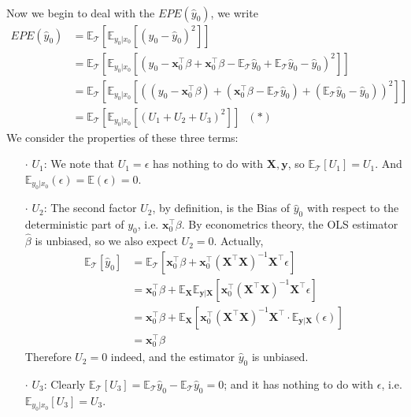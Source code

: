 \documentclass[a4paper, 11pt]{article}
\begin{document}
~\\
Now we begin to deal with the $EPE(\hat{y}_0)$, we write
\begin{equation}
	\begin{split}
		EPE(\hat{y}_0) & = \mathbb{E}_{\mathcal{T}}\left[\mathbb{E}_{y_0|x_0}\left[(y_0-\hat{y}_0)^2\right]\right] \\
		& = \mathbb{E}_{\mathcal{T}}\left[\mathbb{E}_{y_0|x_0}\left[\left(y_0- \bm{x}_0^{\top}\beta + \bm{x}_0^{\top}\beta - \mathbb{E}_{\mathcal{T}}\hat{y}_0 + \mathbb{E}_{\mathcal{T}}\hat{y}_0 - \hat{y}_0\right)^2\right]\right] \\
		& = \mathbb{E}_{\mathcal{T}}\left[\mathbb{E}_{y_0|x_0}\left[\left((y_0- \bm{x}_0^{\top}\beta) + (\bm{x}_0^{\top}\beta - \mathbb{E}_{\mathcal{T}}\hat{y}_0) + (\mathbb{E}_{\mathcal{T}}\hat{y}_0 - \hat{y}_0)\right)^2\right]\right] \\
		& = \mathbb{E}_{\mathcal{T}}\left[\mathbb{E}_{y_0|x_0}\left[\left(U_1 + U_2 + U_3\right)^2\right]\right]~~~(*)
	\end{split}
\end{equation}
We consider the properties of these three terms:
\begin{itemize}
	\item[$\cdot$] $U_1$: We note that $U_1=\epsilon$ has nothing to do with $\bm{X}, \bm{y}$, so $\mathbb{E}_{\mathcal{T}}\left[U_1\right] = U_1$. And $\mathbb{E}_{y_0|x_0}(\epsilon) = \mathbb{E}(\epsilon) = 0$.
	\item[$\cdot$] $U_2$: The second factor $U_2$, by definition, is the Bias of $\hat{y}_0$ with respect to the deterministic part of $y_0$, i.e. $\bm{x}_0^{\top} \beta$. By econometrics theory, the OLS estimator $\hat{\beta}$ is unbiased, so we also expect $U_2=0$. Actually,
	\begin{equation}
		\begin{split}
			\mathbb{E}_{\mathcal{T}}\left[\hat{y}_0\right] &= \mathbb{E}_{\mathcal{T}}\left[\bm{x}_0^{\top} \beta + \bm{x}_0^{\top}(\bm{X}^{\top}\bm{X})^{-1} \bm{X}^{\top}\epsilon\right] \\
			&= \bm{x}_0^{\top} \beta + \mathbb{E}_{\bm{X}}\mathbb{E}_{\bm{y}|\bm{X}}\left[\bm{x}_0^{\top}(\bm{X}^{\top}\bm{X})^{-1} \bm{X}^{\top}\epsilon\right] \\
			&= \bm{x}_0^{\top} \beta + \mathbb{E}_{\bm{X}}\left[\bm{x}_0^{\top}(\bm{X}^{\top}\bm{X})^{-1} \bm{X}^{\top}\cdot \mathbb{E}_{\bm{y}|\bm{X}}\left(\epsilon\right)\right] \\
			&= \bm{x}_0^{\top} \beta
		\end{split}
	\end{equation}
	Therefore $U_2=0$ indeed, and the estimator $\hat{y}_0$ is unbiased.
	\item[$\cdot$] $U_3$: Clearly $\mathbb{E}_{\mathcal{T}}\left[U_3\right] = \mathbb{E}_{\mathcal{T}}\hat{y}_0-\mathbb{E}_{\mathcal{T}}\hat{y}_0=0$; and it has nothing to do with $\epsilon$, i.e. $\mathbb{E}_{y_0|x_0}\left[U_3\right] = U_3$.
\end{itemize}
\end{document}
